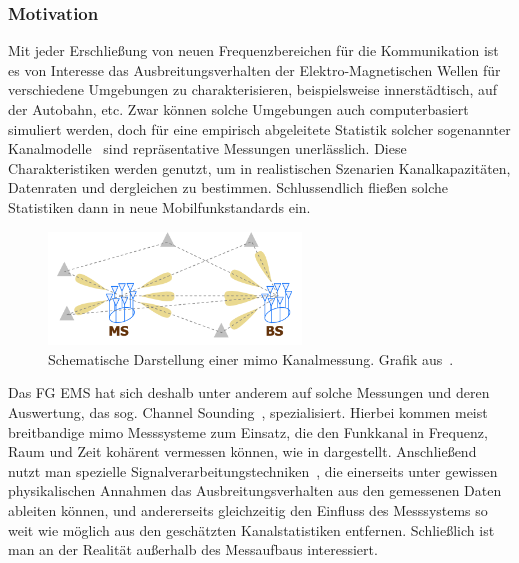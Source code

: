 %
\subsubsection{Motivation}
%
%
Mit jeder Erschlie{\ss}ung von neuen Frequenzbereichen f\"ur die Kommunikation ist es von Interesse das Ausbreitungsverhalten der Elektro-Magnetischen Wellen f\"ur verschiedene Umgebungen zu charakterisieren, beispielsweise innerst\"adtisch, auf der Autobahn, etc. Zwar k\"onnen solche Umgebungen auch computerbasiert simuliert werden, doch f\"ur eine empirisch abgeleitete Statistik solcher sogenannter Kanalmodelle~\cite{delgaldo2007phd} sind repr\"asentative Messungen unerl\"asslich. Diese Charakteristiken werden genutzt, um in realistischen Szenarien Kanalkapazit\"aten, Datenraten und dergleichen zu bestimmen. Schlussendlich flie{\ss}en solche Statistiken dann in neue Mobilfunkstandards ein.

\begin{figure}
    \centering\includegraphics[width=0.6\textwidth]{img/eadf/sounding.png}
    \caption{Schematische Darstellung einer \acrshort{mimo} Kanalmessung. Grafik aus~\cite{richter_estimation_2005}.}\label{eadf_sounding}
\end{figure}

Das FG EMS hat sich deshalb unter anderem auf solche Messungen und deren Auswertung, das sog. Channel Sounding~\cite{thomae2005multidim_hrpe}, spezialisiert. Hierbei kommen meist breitbandige \gls{mimo} Messsysteme zum Einsatz, die den Funkkanal in Frequenz, Raum und Zeit koh\"arent vermessen k\"onnen, wie in  dargestellt. Anschlie{\ss}end nutzt man spezielle Signalverarbeitungstechniken~\cite{semper2023wideband_channel_sounding}, die einerseits unter gewissen physikalischen Annahmen das Ausbreitungsverhalten aus den gemessenen Daten ableiten k\"onnen, und andererseits gleichzeitig den Einfluss des Messsystems so weit wie m\"oglich aus den gesch\"atzten Kanalstatistiken entfernen. Schlie{\ss}lich ist man an der Realit\"at au{\ss}erhalb des Messaufbaus interessiert. 

